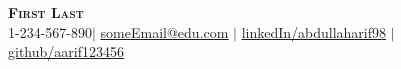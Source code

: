 \documentclass[]{resume-openfont}
\begin{document}
\pagestyle{fancy}
\resetHeaderAndFooter

%
%
\newcommand{\yourName}{First Last}
\newcommand{\yourWebsite}{https://abdullaharif.tech}
\newcommand{\yourEmail}{someEmail@edu.com}
\newcommand{\yourPhone}{1-234-567-890}
\newcommand{\githubUserName}{aarif123456}
\newcommand{\linkedInUserName}{abdullaharif98}


\begin{center}
    \textbf{\Huge \scshape \yourName} \\ \vspace{1pt}
    \small \yourPhone $|$ \href{mailto:\yourEmail}{\underline{\yourEmail}} $|$ 
    \href{https://linkedin.com/in/\linkedInUserName}{\underline{linkedIn/\linkedInUserName}} $|$
    \href{https://github.com/\githubUserName}{\underline{github/\githubUserName}}
\end{center}

%
%
\end{document}
